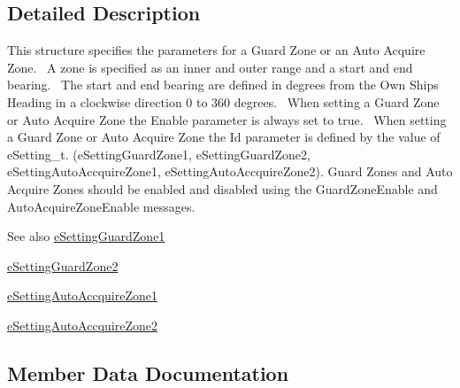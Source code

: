\subsection{Detailed Description}
This structure specifies the parameters for a Guard Zone or an Auto Acquire Zone.~\newline
A zone is specified as an inner and outer range and a start and end bearing.~\newline
The start and end bearing are defined in degrees from the Own Ships Heading in a clockwise direction 0 to 360 degrees.~\newline
When setting a Guard Zone or Auto Acquire Zone the \textquotesingle{}Enable\textquotesingle{} parameter is always set to \textquotesingle{}true\textquotesingle{}.~\newline
When setting a Guard Zone or Auto Acquire Zone the \textquotesingle{}Id\textquotesingle{} parameter is defined by the value of e\+Setting\+\_\+t. (e\+Setting\+Guard\+Zone1, e\+Setting\+Guard\+Zone2, e\+Setting\+Auto\+Accquire\+Zone1, e\+Setting\+Auto\+Accquire\+Zone2). Guard Zones and Auto Acquire Zones should be enabled and disabled using the Guard\+Zone\+Enable and Auto\+Acquire\+Zone\+Enable messages.~\newline
\begin{DoxySeeAlso}{See also}
\mbox{\hyperlink{namespace_quantum_lib_acc8124e3e65bca4aa798d03a55e3d54ca9b2212b5d2855a4c2ea7333997ff63f7}{e\+Setting\+Guard\+Zone1}} 

\mbox{\hyperlink{namespace_quantum_lib_acc8124e3e65bca4aa798d03a55e3d54ca310cbcc138ac9d7731a0b9256989aa3c}{e\+Setting\+Guard\+Zone2}} 

\mbox{\hyperlink{namespace_quantum_lib_acc8124e3e65bca4aa798d03a55e3d54ca2b2bfab6ea7e4e63923519c6a34c3e19}{e\+Setting\+Auto\+Accquire\+Zone1}} 

\mbox{\hyperlink{namespace_quantum_lib_acc8124e3e65bca4aa798d03a55e3d54ca07c900683db032067542bd1bcbcdc418}{e\+Setting\+Auto\+Accquire\+Zone2}} 
\end{DoxySeeAlso}


\subsection{Member Data Documentation}
\mbox{\label{struct_quantum_lib_1_1_zone__t_a541618dd4336d68dc5ba58f04971e3e9}} 
